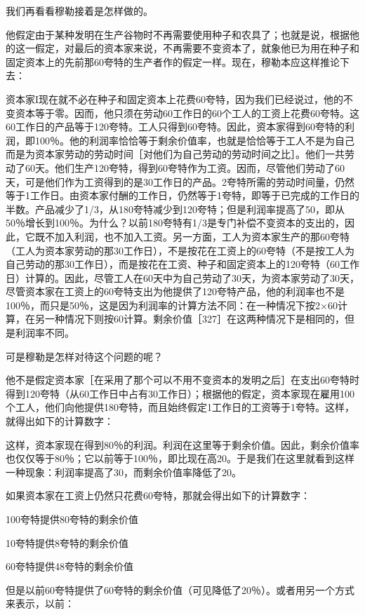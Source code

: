 我们再看看穆勒接着是怎样做的。

他假定由于某种发明在生产谷物时不再需要使用种子和农具了；也就是说，根据他的这一假定，对最后的资本家来说，不再需要不变资本了，就象他已为用在种子和固定资本上的先前那60夸特的生产者作的假定一样。现在，穆勒本应这样推论下去：

资本家I现在就不必在种子和固定资本上花费60夸特，因为我们已经说过，他的不变资本等于零。因而，他只须在劳动60工作日的60个工人的工资上花费60夸特。这60工作日的产品等于120夸特。工人只得到60夸特。因此，资本家得到60夸特的利润，即100％。他的利润率恰恰等于剩余价值率，也就是恰恰等于工人不是为自己而是为资本家劳动的劳动时间［对他们为自己劳动的劳动时间之比］。他们一共劳动了60天。他们生产120夸特，得到60夸特作为工资。因而，尽管他们劳动了60天，可是他们作为工资得到的是30工作日的产品。2夸特所需的劳动时间量，仍然等于1工作日。由资本家付酬的工作日，仍然等于1夸特，即等于已完成的工作日的半数。产品减少了1/3，从180夸特减少到120夸特；但是利润率提高了50，即从50％增长到100％。为什么？以前180夸特有1/3是专门补偿不变资本的支出的，因此，它既不加入利润，也不加入工资。另一方面，工人为资本家生产的那60夸特（工人为资本家劳动的那30工作日），不是按花在工资上的60夸特（不是按工人为自己劳动的那30工作日），而是按花在工资、种子和固定资本上的120夸特（60工作日）计算的。因此，尽管工人在60天中为自己劳动了30天，为资本家劳动了30天，尽管资本家在工资上的60夸特支出为他提供了120夸特产品，他的利润率也不是100％，而只是50％，这是因为利润率的计算方法不同：在一种情况下按2×60计算，在另一种情况下则按60计算。剩余价值［327］在这两种情况下是相同的，但是利润率不同。

可是穆勒是怎样对待这个问题的呢？

他不是假定资本家［在采用了那个可以不用不变资本的发明之后］在支出60夸特时得到120夸特（从60工作日中占有30工作日）；根据他的假定，资本家现在雇用100个工人，他们向他提供180夸特，而且始终假定1工作日的工资等于1夸特。这样，就得出如下的计算数字：

\todo{}

这样，资本家现在得到80％的利润。利润在这里等于剩余价值。因此，剩余价值率也仅仅等于80％；它以前等于100％，即比现在高20。于是我们在这里就看到这样一种现象：利润率提高了30，而剩余价值率降低了20。

如果资本家在工资上仍然只花费60夸特，那就会得出如下的计算数字：

100夸特提供80夸特的剩余价值

10夸特提供8夸特的剩余价值

60夸特提供48夸特的剩余价值

但是以前60夸特提供了60夸特的剩余价值（可见降低了20％）。或者用另一个方式来表示，以前：

